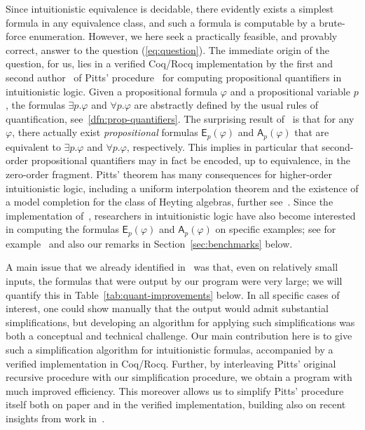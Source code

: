 \documentclass[english,review]{jflart}
\newcommand{\Coq}{{Coq/Rocq}}
\theoremstyle{definition}
\theoremstyle{plain}
\newcommand{\Ap}[1]{\mathsf{A}_{p}(#1)}
\newcommand{\Ep}[1]{\mathsf{E}_{p}(#1)}
\renewcommand{\phi}{\varphi}
\begin{document}
Since intuitionistic equivalence is decidable, there evidently exists a simplest formula in any equivalence class, and such a formula is computable by a brute-force enumeration. However, we here seek a practically feasible, and provably correct, answer to the question (\ref{eq:question}).
The immediate origin of the question, for us, lies in a verified {\Coq} implementation by the first and second author~\cite{FerGoo2023} of Pitts' procedure~\cite{Pit1992} for computing propositional quantifiers in intuitionistic logic. Given a propositional formula $\phi$ and a propositional variable $p$, the formulas $\exists p. \phi$ and $\forall p. \phi$ are abstractly defined by the usual rules of quantification, see~\cref{dfn:prop-quantifiers}. The surprising result of~\cite{Pit1992} is that for any $\phi$, there actually exist \emph{propositional} formulas $\Ep{\phi}$ and $\Ap{\phi}$ that are equivalent to $\exists p. \phi$ and $\forall p. \phi$, respectively. This implies in particular that second-order propositional quantifiers may in fact be encoded, up to equivalence, in the zero-order fragment. Pitts' theorem has many consequences for higher-order intuitionistic logic, including a uniform interpolation theorem and the existence of a model completion for the class of Heyting algebras, further see~\cite{GhiZaw2002}. Since the implementation of~\cite{FerGoo2023}, researchers in intuitionistic logic have also become interested in computing the formulas $\Ep{\phi}$ and $\Ap{\phi}$ on specific examples; see for example~\cite{Koc2023} and also our remarks in Section~\ref{sec:benchmarks} below.

A main issue that we already identified in~\cite{FerGoo2023} was that, even on relatively small inputs, the formulas that were output by our program were very large; we will quantify this in Table~\ref{tab:quant-improvements} below. In all specific cases of interest, one could show manually that the output would admit substantial simplifications, but developing an algorithm for applying such simplifications was both a conceptual and technical challenge. Our main contribution here is to give such a simplification algorithm for intuitionistic formulas, accompanied by a verified implementation in {\Coq}. Further, by interleaving Pitts' original recursive procedure with our simplification procedure, we obtain a program with much improved efficiency. This moreover allows us to simplify Pitts' procedure itself both on paper and in the verified implementation, building also on recent insights from work in~\cite{FGGS2024}. 
\end{document}
